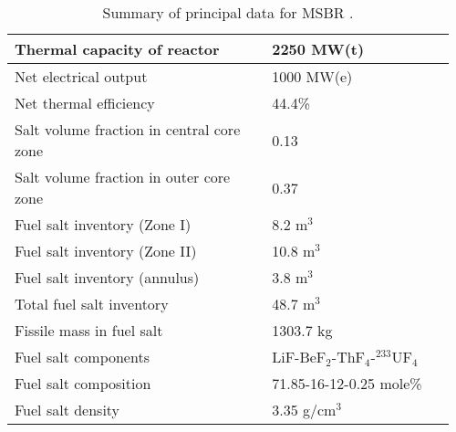 \begin{table}[h!]
        \caption{Summary of principal data for MSBR \cite{robertson_conceptual_1971}.}
        \begin{tabular}{|m{0.56\linewidth} | m{0.40\linewidth}|}
        \hline
                Thermal capacity of reactor           & 2250 MW(t)
                \\ [5pt] \hline 
                Net electrical output                 & 1000 MW(e) 
                \\ [5pt] \hline 
                Net thermal efficiency        & 44.4\%
                \\ [5pt] \hline 
                Salt volume fraction in central core zone     & 0.13
                \\ [5pt] \hline 
                Salt volume fraction in outer core zone       & 0.37
                \\ [5pt] \hline 
                Fuel salt inventory (Zone I)                  & 8.2 m$^3$	
                \\ [5pt] \hline 
                Fuel salt inventory (Zone II)                 & 10.8 m$^3$	
                \\ [5pt] \hline 
                Fuel salt inventory (annulus)                 & 3.8 m$^3$	
                \\ [5pt] \hline 
                Total fuel salt inventory                     & 48.7 m$^3$	
                \\ [5pt] \hline 
                Fissile mass in fuel salt                   & 1303.7 kg	
                \\ [5pt] \hline 
                Fuel salt components                  & 
                LiF-BeF$_2$-ThF$_4$-$^{233}$UF$_4$	
                \\ [5pt] \hline 
                Fuel salt composition                 & 
                71.85-16-12-0.25 mole\%
                \\[5pt]  \hline 
                Fuel salt density                    & 
                3.35 g/cm$^3$
                \\[5pt]  \hline 
        \end{tabular}
        \label{tab:msbr_tab}
\end{table}

